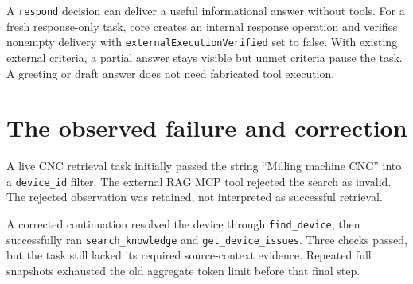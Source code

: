 A \texttt{respond} decision can deliver a useful informational answer without tools. For a fresh response-only task, core creates an internal response operation and verifies nonempty delivery with \texttt{externalExecutionVerified} set to false. With existing external criteria, a partial answer stays visible but unmet criteria pause the task. A greeting or draft answer does not need fabricated tool execution.
\section*{The observed failure and correction}
A live CNC retrieval task initially passed the string ``Milling machine CNC'' into a \texttt{device\_id} filter. The external RAG MCP tool rejected the search as invalid. The rejected observation was retained, not interpreted as successful retrieval.

A corrected continuation resolved the device through \texttt{find\_device}, then successfully ran \texttt{search\_knowledge} and \texttt{get\_device\_issues}. Three checks passed, but the task still lacked its required source-context evidence. Repeated full snapshots exhausted the old aggregate token limit before that final step.
